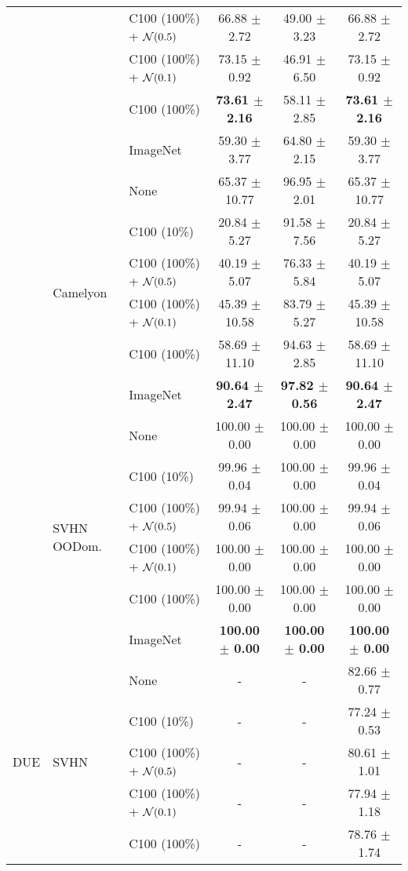 \begin{table}[!htb]
\begin{tabular}{lllccc}
& &C100 (100\%) + ${\mathcal{N}}(0.5)$ &66.88 $\pm$ 2.72 &49.00 $\pm$ 3.23 &66.88 $\pm$ 2.72 \\
& &C100 (100\%) + ${\mathcal{N}}(0.1)$ &73.15 $\pm$ 0.92 &46.91 $\pm$ 6.50 &73.15 $\pm$ 0.92 \\
    & &C100 (100\%) &\textbf{73.61 $\pm$ 2.16} &58.11 $\pm$ 2.85 &\textbf{73.61 $\pm$ 2.16} \\
    & &ImageNet &59.30 $\pm$ 3.77 &64.80 $\pm$ 2.15 &59.30 $\pm$ 3.77 \\
    \cmidrule[0.1pt](lr){2-6}
    &\multirow{6}{*}{Camelyon} &None &65.37 $\pm$ 10.77 &96.95 $\pm$ 2.01 &65.37 $\pm$ 10.77 \\
    & &C100 (10\%) &20.84 $\pm$ 5.27 &91.58 $\pm$ 7.56 &20.84 $\pm$ 5.27 \\
& &C100 (100\%) + ${\mathcal{N}}(0.5)$ &40.19 $\pm$ 5.07 &76.33 $\pm$ 5.84 &40.19 $\pm$ 5.07 \\
& &C100 (100\%) + ${\mathcal{N}}(0.1)$ &45.39 $\pm$ 10.58 &83.79 $\pm$ 5.27 &45.39 $\pm$ 10.58 \\
    & &C100 (100\%) &58.69 $\pm$ 11.10 &94.63 $\pm$ 2.85 &58.69 $\pm$ 11.10 \\
    & &ImageNet &\textbf{90.64 $\pm$ 2.47} &\textbf{97.82 $\pm$ 0.56} &\textbf{90.64 $\pm$ 2.47} \\
    \cmidrule[0.1pt](lr){2-6}
    &\multirow{6}{*}{SVHN OODom.} &None &100.00 $\pm$ 0.00 &100.00 $\pm$ 0.00 &100.00 $\pm$ 0.00 \\
    & &C100 (10\%) &99.96 $\pm$ 0.04 &100.00 $\pm$ 0.00 &99.96 $\pm$ 0.04 \\
& &C100 (100\%) + ${\mathcal{N}}(0.5)$ &99.94 $\pm$ 0.06 &100.00 $\pm$ 0.00 &99.94 $\pm$ 0.06 \\
& &C100 (100\%) + ${\mathcal{N}}(0.1)$ &100.00 $\pm$ 0.00 &100.00 $\pm$ 0.00 &100.00 $\pm$ 0.00 \\
    & &C100 (100\%) &100.00 $\pm$ 0.00 &100.00 $\pm$ 0.00 &100.00 $\pm$ 0.00 \\
    & &ImageNet &\textbf{100.00 $\pm$ 0.00} &\textbf{100.00 $\pm$ 0.00} &\textbf{100.00 $\pm$ 0.00} \\
    \midrule
    \multirow{30}{*}{DUE} &\multirow{6}{*}{SVHN} &None &- &- &82.66 $\pm$ 0.77 \\
    & &C100 (10\%) &- &- &77.24 $\pm$ 0.53 \\
& &C100 (100\%) + ${\mathcal{N}}(0.5)$ &- &- &80.61 $\pm$ 1.01 \\
& &C100 (100\%) + ${\mathcal{N}}(0.1)$ &- &- &77.94 $\pm$ 1.18 \\
    & &C100 (100\%) &- &- &78.76 $\pm$ 1.74 \\

\end{tabular}
\end{table}
